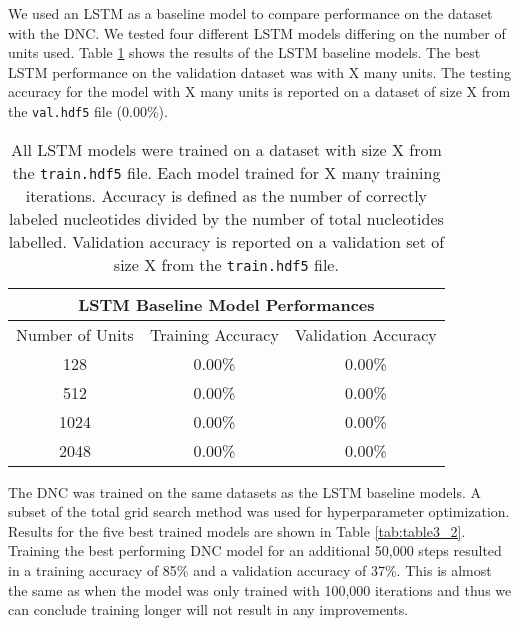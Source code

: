 We used an LSTM as a baseline model to compare performance on the dataset with
the DNC. We tested four different LSTM models differing on the number of units
used. Table \ref{tab:table3_1} shows the results of the LSTM baseline models.
The best LSTM performance on the validation dataset was with X many units.
The testing accuracy for the model with X many units is reported on a dataset
of size X from the \texttt{val.hdf5} file (0.00\%).

\begin{table}[h!]
\begin{center}
\begin{tabular}{ | c || c | c | }
 \hline
 \multicolumn{3}{|c|}{\bf{LSTM Baseline Model Performances}} \\
 \hline
 Number of Units & Training Accuracy & Validation Accuracy \\
 \hline
 128  & 0.00\% & 0.00\% \\
 512  & 0.00\% & 0.00\% \\
 1024 & 0.00\% & 0.00\% \\
 2048 & 0.00\% & 0.00\% \\
 \hline
\end{tabular}
\caption{
    All LSTM models were trained on a dataset with size X from
    the \texttt{train.hdf5} file. Each model trained for X many training
    iterations. Accuracy is defined as the number of correctly labeled
    nucleotides divided by the number of total nucleotides labelled. Validation
    accuracy is reported on a validation set of size X from the
    \texttt{train.hdf5} file.
}
\label{tab:table3_1}
\end{center}
\end{table}

The DNC was trained on the same datasets as the LSTM baseline models. A subset
of the total grid search method was used for hyperparameter optimization.
Results for the five best trained models are shown in Table \ref{tab:table3_2}.
Training the best performing DNC model for an additional 50,000 steps resulted
in a training accuracy of 85\% and a validation accuracy of 37\%. This is
almost the same as when the model was only trained with 100,000 iterations and
thus we can conclude training longer will not result in any improvements.

